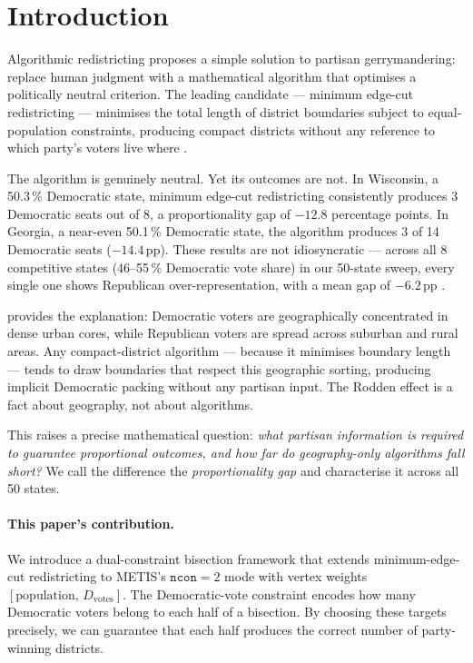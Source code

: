 \section{Introduction}
\label{sec:intro}

Algorithmic redistricting proposes a simple solution to partisan gerrymandering:
replace human judgment with a mathematical algorithm that optimises a
politically neutral criterion.
The leading candidate --- minimum edge-cut redistricting --- minimises the
total length of district boundaries subject to equal-population constraints,
producing compact districts without any reference to which party's voters
live where \citep{karypis1998,b8paper,b9paper}.

The algorithm is genuinely neutral.
Yet its outcomes are not.
In Wisconsin, a 50.3\,\% Democratic state, minimum edge-cut redistricting
consistently produces 3 Democratic seats out of 8, a proportionality gap of
$-12.8$ percentage points.
In Georgia, a near-even 50.1\,\% Democratic state, the algorithm produces
3 of 14 Democratic seats ($-14.4$\,pp).
These results are not idiosyncratic --- across all 8 competitive states
(46--55\,\% Democratic vote share) in our 50-state sweep, every single one
shows Republican over-representation, with a mean gap of $-6.2$\,pp
\citep{b9paper}.

\citet{rodden2019} provides the explanation: Democratic voters are geographically
concentrated in dense urban cores, while Republican voters are spread across
suburban and rural areas.
Any compact-district algorithm --- because it minimises boundary length ---
tends to draw boundaries that respect this geographic sorting, producing
implicit Democratic packing without any partisan input.
The Rodden effect is a fact about geography, not about algorithms.

This raises a precise mathematical question: \emph{what partisan information
is required to guarantee proportional outcomes, and how far do geography-only
algorithms fall short?}
We call the difference the \emph{proportionality gap} and characterise it
across all 50 states.

\paragraph{This paper's contribution.}
We introduce a dual-constraint bisection framework that extends minimum-edge-cut
redistricting to METIS's $\mathtt{ncon}=2$ mode with vertex weights
$[\text{population},\, D_{\text{votes}}]$.
The Democratic-vote constraint encodes how many Democratic voters belong to
each half of a bisection.
By choosing these targets precisely, we can guarantee that each half produces
the correct number of party-winning districts.

